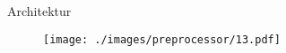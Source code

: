 \begin{frame}{Architektur}
    \begin{figure}
    	\centering
    	\texttt{[image: ./images/preprocessor/13.pdf]}
    \end{figure}
\end{frame}
